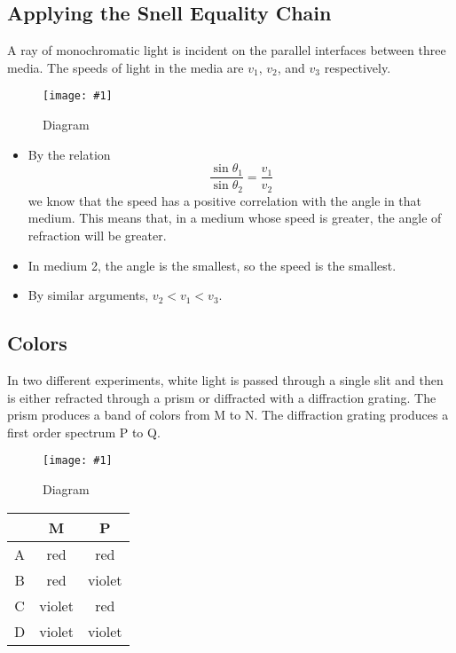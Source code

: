 \documentclass[a4paper,12pt]{article}
\newcommand{\img}[4]{\begin{center}
  \begin{figure}[H]
    \centering
    \texttt{[image: \#1]}
    \caption{#3}
    \label{fig:#4}
  \end{figure}
\end{center}}
\begin{document}
\subsection{Applying the Snell Equality Chain}

A ray of monochromatic light is incident on the parallel interfaces between three media. The speeds of light in the media are $v_1$, $v_2$, and $v_3$ respectively.

\img{ex/9.png}{0.5}{Diagram}{ex9}

\begin{itemize}
  \item By the relation $$\frac{\sin\theta_1}{\sin\theta_2} = \frac{v_1}{v_2}$$
        we know that the speed has a positive correlation with the angle in that medium. This means that, in a medium whose speed is greater, the angle of refraction will be greater.
  \item In medium 2, the angle is the smallest, so the speed is the smallest.
  \item By similar arguments, $v_2 < v_1 < v_3$.

\end{itemize}

\pagebreak

\subsection{Colors}


In two different experiments, white light is passed through a single slit and then is either refracted through a prism or diffracted with a diffraction grating. The prism produces a band of colors from M to N. The diffraction grating produces a first order spectrum P to Q.

\img{ex/10.png}{0.9}{Diagram}{ex10}

\begin{table}[H]

  \begin{tabular}{|c|c|c|}
    \hline
      & M      & P      \\ \hline
    A & red    & red    \\ \hline
    B & red    & violet \\ \hline
    C & violet & red    \\ \hline
    D & violet & violet \\ \hline
  \end{tabular}
\end{table}
\end{document}
